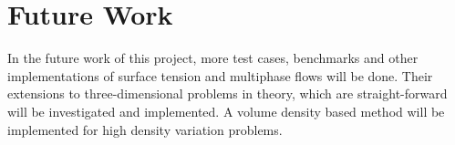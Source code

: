 \documentclass[oneside]{iitbreport}
\begin{document}
\chapter{Future Work}

In the future work of this project, more test cases, benchmarks and other implementations of surface tension and multiphase flows will be done. Their extensions to three-dimensional problems in theory, which are straight-forward will be investigated and implemented. A volume density based method will be implemented for high density variation problems.


     

%             

           


\end{document}
